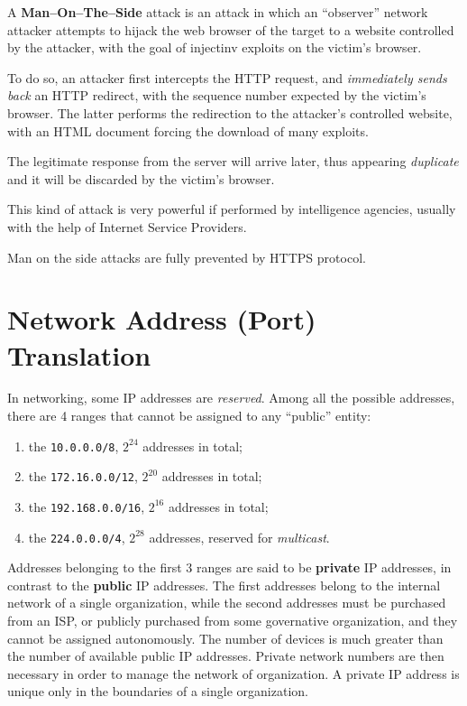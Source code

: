 \documentclass[10pt]{extbook}
\begin{document}
A \textbf{Man--On--The--Side} attack is an attack in which an ``observer''
network attacker attempts to hijack the web browser of the target to a website
controlled by the attacker, with the goal of injectinv exploits on the victim's
browser.

To do so, an attacker first intercepts the HTTP request, and \emph{immediately
sends back} an HTTP redirect, with the sequence number expected by the victim's
browser. The latter performs the redirection to the attacker's controlled
website, with an HTML document forcing the download of many exploits.

The legitimate response from the server will arrive later, thus appearing
\emph{duplicate} and it will be discarded by the victim's browser.

This kind of attack is very powerful if performed by intelligence agencies,
usually with the help of Internet Service Providers.

Man on the side attacks are fully prevented by HTTPS protocol.

\chapter{Network Address (Port) Translation}

In networking, some IP addresses are \emph{reserved}. Among all the possible
addresses, there are 4 ranges that cannot be assigned to any ``public'' entity:
\begin{enumerate}
    \item the \texttt{10.0.0.0/8}, $2^{24}$ addresses in total;
    \item the \texttt{172.16.0.0/12}, $2^{20}$ addresses in total; 
    \item the \texttt{192.168.0.0/16}, $2^{16}$ addresses in total; 
    \item the \texttt{224.0.0.0/4}, $2^{28}$ addresses, reserved for
        \emph{multicast}.
\end{enumerate}

Addresses belonging to the first 3 ranges are said to be \textbf{private} IP
addresses, in contrast to the \textbf{public} IP addresses. The first addresses
belong to the internal network of a single organization, while the second
addresses must be purchased from an ISP, or publicly purchased from some
governative organization, and they cannot be assigned autonomously. The number
of devices is much greater than the number of available public IP addresses.
Private network numbers are then necessary in order to manage the network of
organization. A private IP address is unique only in the boundaries of a single
organization.
\end{document}
